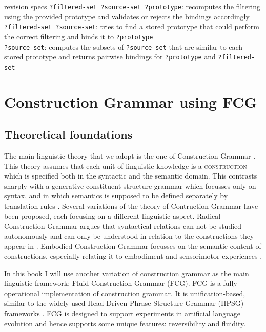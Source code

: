\begin{explanation}{revision specs}
  \verb+?filtered-set ?source-set ?prototype+: recomputes the filtering using the provided prototype and validates or rejects the bindings accordingly \\
  \verb+?filtered-set ?source-set+: tries to find a stored prototype that could perform the correct filtering and binds it to \verb+?prototype+ \\
  \verb+?source-set+: computes the subsets of \verb+?source-set+ that
  are similar to each stored prototype and returns pairwise bindings
  for \verb+?prototype+ and \verb+?filtered-set+
\end{explanation}

\section{Construction Grammar using FCG}
\label{s:fcg}

\subsection{Theoretical foundations}

The main linguistic theory that we adopt is the one of Construction
Grammar \citep{goldberg95constructions, goldberg03constructions}. This
theory assumes that each unit of linguistic knowledge is a
\textsc{construction} which is specified both in the syntactic and the
semantic domain. This contrasts sharply with a generative constituent
structure grammar which focusses only on syntax, and in which
semantics is supposed to be defined separately by translation rules
\citep{chomsky57syntactic}. Several variations of the theory
of Contruction Grammar have been proposed, each focusing on a different
linguistic aspect. Radical Construction Grammar argues that
syntactical relations can not be studied autonomously and can only be
understood in relation to the constructions they appear in
\citep{croft01radical}. Embodied Construction Grammar focusses on the
semantic content of constructions, especially relating it to
embodiment and sensorimotor experiences \citep{bergen03embodied}.

In this book I will use another variation of construction grammar as the main linguistic framework:
Fluid Construction Grammar (FCG). FCG
is a fully operational implementation of construction grammar. It is
unification-based, similar to the widely used Head-Driven Phrase
Structure Grammar (HPSG) frameworks \citep{pollard94hpsg}. FCG is
designed to support experiments in artificial language evolution and
hence supports some unique features: reversibility and fluidity.

